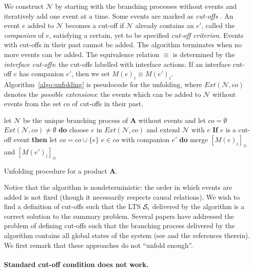 \documentclass{llncs}
\def\prod{\mathbf{A}}
\def\N{\mathcal{N}}
\def\S{\mathcal{S}}
\def\co{co}
\renewcommand{\S}{{\cal S}}
\begin{document}
We construct $\N$ by starting with the branching processes without events and
iteratively add one event at a time.
Some events are marked as {\em cut-offs} \cite{Esparza08}. An event $e$ added to $\N$ becomes 
a cut-off if $\N$ already contains an $e'$, called the {\em companion} of $e$, satisfying 
a certain, yet to be specified \emph{cut-off criterion}. Events with cut-offs
in their past cannot be added. The algorithm 
terminates when no more events can be added. 
The equivalence relation $\equiv$ is determined by the {\em interface cut-offs}: the cut-offs labelled with interface actions. 
If an interface cut-off $e$ has companion $e'$, then we set $M(e)_i\equiv M(e')_i$. 
Algorithm~\ref{algo:unfolding} is pseudocode for the unfolding, where
$Ext(\N,co)$ denotes the 
{\em possible extensions}: the events which can be added to $\N$ without
events from the set $co$ of cut-offs in their past.

\begin{algorithm}[htbp]
\begin{algorithmic}
\State let $\N$ be the unique branching process of $\prod$ without events and let $\co=\emptyset$
 $Ext(\N,\co)\neq\emptyset$ {\bf do}
\State\hspace*{0.4cm} choose $e$ in $Ext(\N,\co)$ and extend $\N$ with $e$
\State\hspace*{0.4cm} {\bf If} $e$ is a cut-off event {\bf then} let $\co=\co\cup\{e\}$
 $e\in\co$ with companion $e'$ {\bf do} merge $[M(e)_i]_\equiv$ and $[M(e')_i]_\equiv$
\end{algorithmic}
\caption{Unfolding procedure for a product $\prod$.}
\label{algo:unfolding}
\end{algorithm}

Notice that the algorithm is nondeterministic: the order
in which events are added is not fixed (though it necessarily respects causal relations).
We wish to find a definition of cut-offs such that the LTS $\S_i$
delivered by the algorithm
is a correct solution to the summary problem. 
Several papers have addressed the problem of defining cut-offs such that the
branching process delivered by the algorithm contains all global states of 
the system (see \cite{Esparza08} and the references therein). 
We first remark that these approaches do not ``unfold enough''.


\paragraph{\bf Standard cut-off condition does not work.}
\end{document}
